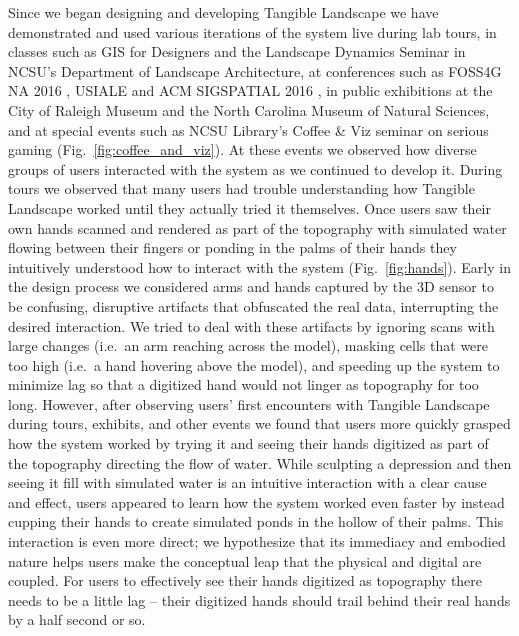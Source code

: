 \documentclass[prodmode,acmtochi]{acmsmall} %
\begin{document}
Since we began designing and developing Tangible Landscape 
we have demonstrated and used various iterations of the system live 
during lab tours,
in classes such as 
GIS for Designers and the Landscape Dynamics Seminar
in NCSU's Department of Landscape Architecture,  
at conferences such as
FOSS4G NA 2016 \cite{Petrasova2016a,Harmon2016e},
USIALE 
and ACM SIGSPATIAL 2016 \cite{Tabrizian2016}, 
in public exhibitions at the City of Raleigh Museum and 
the North Carolina Museum of Natural Sciences,
and at special events 
such as NCSU Library's Coffee \& Viz seminar on serious gaming
\cite{Harmon2016d} (Fig.~\ref{fig:coffee_and_viz}). 
%
At these events
we observed how diverse groups of users 
interacted with the system
as we continued to develop it. 
%
During tours 
we observed that many users had trouble understanding 
how Tangible Landscape worked
until they actually tried it themselves. 
%
Once users saw their own hands scanned
and rendered as part of the topography
with simulated water flowing between their fingers
or ponding in the palms of their hands
they intuitively understood how to interact with the system
(Fig.~\ref{fig:hands}).
%
Early in the design process
we considered 
arms and hands captured by the 3D sensor
to be confusing, disruptive artifacts
that obfuscated the real data, 
interrupting the desired interaction. 
%
We tried to deal with these artifacts
by ignoring scans with large changes
(i.e.~an arm reaching across the model), 
masking cells that were too high
(i.e.~a hand hovering above the model),
and speeding up the system to minimize lag
so that a digitized hand would not 
linger as topography for too long. 
%
However, 
after observing users' first encounters with Tangible Landscape 
during tours, exhibits, and other events
we found that users more quickly grasped
how the system worked 
by trying it and seeing their hands digitized
as part of the topography
directing the flow of water. 
%
While sculpting a depression 
and then seeing it fill with simulated water 
is an intuitive interaction with a clear cause and effect,
users appeared to learn how the system worked even faster 
by instead cupping their hands to create simulated ponds
in the hollow of their palms. 
%
This interaction is even more direct;
we hypothesize that its immediacy and embodied nature
helps users make the conceptual leap 
that the physical and digital are coupled. 
%
For users to effectively see their hands digitized as topography
there needs to be a little lag -- 
their digitized hands should trail behind their real hands
by a half second or so. 
\end{document}
